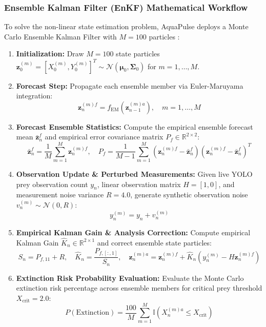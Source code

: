 \documentclass[11pt,a4paper]{article}
\newcommand{\citeblue}[1]{{\color{linkblue}\cite{#1}}}
\begin{document}
\subsubsection{Ensemble Kalman Filter (EnKF) Mathematical Workflow}
To solve the non-linear state estimation problem, AquaPulse deploys a Monte Carlo Ensemble Kalman Filter with $M = 100$ particles \citeblue{sprungk2023, evensen2009data}:
\begin{enumerate}
    \item \textbf{Initialization:} Draw $M=100$ state particles $\mathbf{z}_0^{(m)} = [X_0^{(m)}, Y_0^{(m)}]^T \sim \mathcal{N}(\boldsymbol{\mu}_0, \boldsymbol{\Sigma}_0)$ for $m=1, \dots, M$.
    \item \textbf{Forecast Step:} Propagate each ensemble member via Euler-Maruyama integration:
    \begin{equation}
    \mathbf{z}_n^{(m) f} = f_{\text{EM}}(\mathbf{z}_{n-1}^{(m) a}), \quad m=1,\dots,M
    \end{equation}
    \item \textbf{Forecast Ensemble Statistics:} Compute the empirical ensemble forecast mean $\bar{\mathbf{z}}_n^f$ and empirical error covariance matrix $P_f \in \mathbb{R}^{2 \times 2}$:
    \begin{equation}
    \bar{\mathbf{z}}_n^f = \frac{1}{M} \sum_{m=1}^M \mathbf{z}_n^{(m) f}, \quad P_f = \frac{1}{M-1} \sum_{m=1}^M \left(\mathbf{z}_n^{(m) f} - \bar{\mathbf{z}}_n^f\right) \left(\mathbf{z}_n^{(m) f} - \bar{\mathbf{z}}_n^f\right)^T
    \end{equation}
    \item \textbf{Observation Update \& Perturbed Measurements:} Given live YOLO prey observation count $y_n$, linear observation matrix $H = [1, 0]$, and measurement noise variance $R = 4.0$, generate synthetic observation noise $v_n^{(m)} \sim \mathcal{N}(0, R)$:
    \begin{equation}
    y_n^{(m)} = y_n + v_n^{(m)}
    \end{equation}
    \item \textbf{Empirical Kalman Gain \& Analysis Correction:} Compute empirical Kalman Gain $\hat{K}_n \in \mathbb{R}^{2 \times 1}$ and correct ensemble state particles:
    \begin{equation}
    S_n = P_{f, 11} + R, \quad \hat{K}_n = \frac{P_{f, [:, 1]}}{S_n}, \quad \mathbf{z}_n^{(m) a} = \mathbf{z}_n^{(m) f} + \hat{K}_n \left(y_n^{(m)} - H \mathbf{z}_n^{(m) f}\right)
    \end{equation}
    \item \textbf{Extinction Risk Probability Evaluation:} Evaluate the Monte Carlo extinction risk percentage across ensemble members for critical prey threshold $X_{\text{crit}} = 2.0$:
    \begin{equation}
    P(\text{Extinction}) = \frac{100}{M} \sum_{m=1}^M \mathbb{I}\left(X_n^{(m) a} \le X_{\text{crit}}\right)
    \end{equation}
\end{enumerate}
\end{document}
